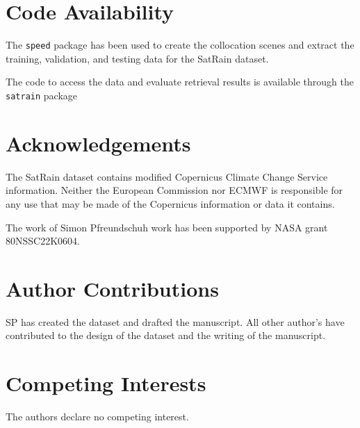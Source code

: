 \documentclass[11pt]{article}
\begin{document}
\section*{Code Availability}

The \texttt{speed} package \citep{Speed2025} has been used to create the
collocation scenes and extract the training, validation, and testing data for
the SatRain dataset.

The code to access the data and evaluate retrieval results is available through
the \texttt{satrain} package \citep{SatRain2025}

\section*{Acknowledgements}


The SatRain dataset contains modified Copernicus Climate Change Service
information. Neither the European Commission nor ECMWF is responsible for any
use that may be made of the Copernicus information or data it contains.

The work of Simon Pfreundschuh work has been supported by NASA grant 80NSSC22K0604.


\section*{Author Contributions}

SP has created the dataset and drafted the manuscript. All other author's have
contributed to the design of the dataset and the writing of the manuscript.


\section*{Competing Interests}

The authors declare no competing interest.





\end{document}
